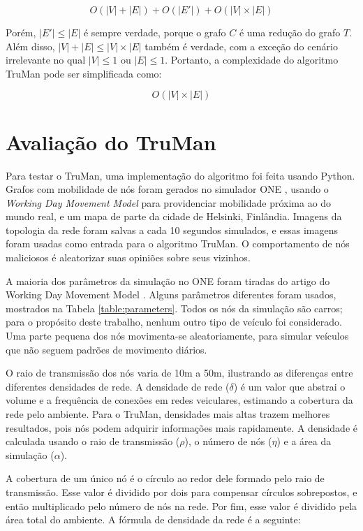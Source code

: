 \begin{resumoextendido}
	$$ O(|V|+|E|) + O(|E'|) + O(|V|\times |E|)$$
	
	Porém, $|E'| \leq |E|$ é sempre verdade, porque o grafo $C$ é uma redução do grafo $T$.
	Além disso, $|V|+|E| \leq |V|\times |E|$ também é verdade, com a exceção do cenário irrelevante no qual $|V| \leq 1$ ou $|E| \leq 1$.
	Portanto, a complexidade do algoritmo TruMan pode ser simplificada como:
	
	$$O(|V| \times |E|)$$
	
	\section*{Avaliação do TruMan}
	
	Para testar o TruMan, uma implementação do algoritmo foi feita usando Python.
	Grafos com mobilidade de nós foram gerados no simulador ONE \citep{keranen2009one}, usando o \textit{Working Day Movement Model} \citep{ekman2008working} para providenciar mobilidade próxima ao do mundo real, e um mapa de parte da cidade de Helsinki, Finlândia.
	Imagens da topologia da rede foram salvas a cada 10 segundos simulados, e essas imagens foram usadas como entrada para o algoritmo TruMan.
	O comportamento de nós maliciosos é aleatorizar suas opiniões sobre seus vizinhos.
	
	A maioria dos parâmetros da simulação no ONE foram tiradas do artigo do Working Day Movement Model \citep{ekman2008working}.
	Alguns parâmetros diferentes foram usados, mostrados na Tabela \ref{table:parameters}.
	Todos os nós da simulação são carros; para o propósito deste trabalho, nenhum outro tipo de veículo foi considerado.
	Uma parte pequena dos nós movimenta-se aleatoriamente, para simular veículos que não seguem padrões de movimento diários.
	
	O raio de transmissão dos nós varia de 10m a 50m, ilustrando as diferenças entre diferentes densidades de rede.
	A densidade de rede ($\delta$) é um valor que abstrai o volume e a frequência de conexões em redes veiculares, estimando a cobertura da rede pelo ambiente.
	Para o TruMan, densidades mais altas trazem melhores resultados, pois nós podem adquirir informações mais rapidamente.
	A densidade é calculada usando o raio de transmissão ($\rho$), o número de nós ($\eta$) e a área da simulação ($\alpha$).
	
	A cobertura de um único nó é o círculo ao redor dele formado pelo raio de transmissão.
	Esse valor é dividido por dois para compensar círculos sobrepostos, e então multiplicado pelo número de nós na rede.
	Por fim, esse valor é dividido pela área total do ambiente.
	A fórmula de densidade da rede é a seguinte:
	

\end{resumoextendido}
